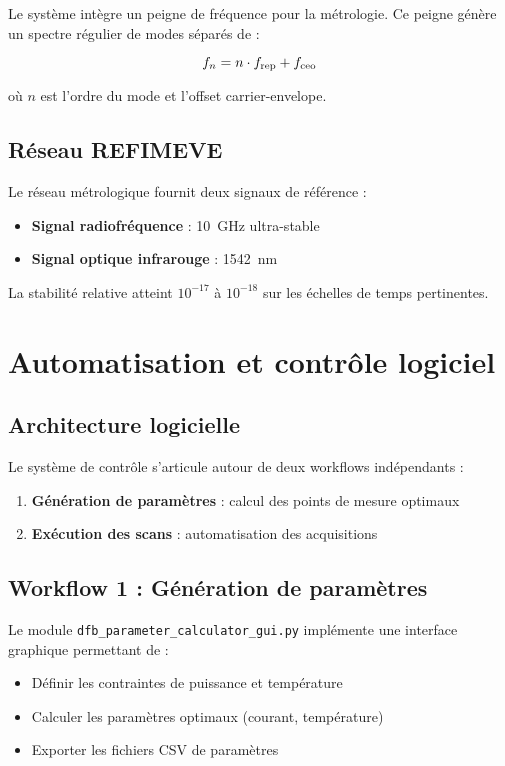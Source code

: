 Le système intègre un peigne de fréquence \Toptica{} \DFCcore{} pour la métrologie. Ce peigne génère un spectre régulier de modes séparés de \frep{} :

\begin{equation}
f_n = n \cdot f_{\text{rep}} + f_{\text{ceo}}
\end{equation}

où $n$ est l'ordre du mode et \fceo{} l'offset carrier-envelope.

\subsection{Réseau REFIMEVE}

Le réseau métrologique \REFIMEVE{} fournit deux signaux de référence :
\begin{itemize}
    \item \textbf{Signal radiofréquence} : \SI{10}{\GHz} ultra-stable
    \item \textbf{Signal optique infrarouge} : \SI{1542}{\nano\meter}
\end{itemize}

La stabilité relative atteint $10^{-17}$ à $10^{-18}$ sur les échelles de temps pertinentes.

\section{Automatisation et contrôle logiciel}

\subsection{Architecture logicielle}

Le système de contrôle s'articule autour de deux workflows indépendants :

\begin{enumerate}
    \item \textbf{Génération de paramètres} : calcul des points de mesure optimaux
    \item \textbf{Exécution des scans} : automatisation des acquisitions
\end{enumerate}

\subsection{Workflow 1 : Génération de paramètres}

Le module \texttt{dfb\_parameter\_calculator\_gui.py} implémente une interface graphique permettant de :
\begin{itemize}
    \item Définir les contraintes de puissance et température
    \item Calculer les paramètres optimaux (courant, température)
    \item Exporter les fichiers CSV de paramètres
\end{itemize}

